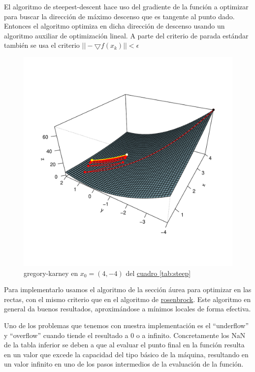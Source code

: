 El algoritmo de steepest-descent hace uso del gradiente de la función a optimizar para buscar la dirección de máximo descenso que es tangente al punto dado. Entonces el algoritmo optimiza en dicha dirección de descenso usando un algoritmo auxiliar de optimización lineal. A parte del criterio de parada estándar también se usa el criterio $|| - \bigtriangledown f(x_k) || < \epsilon $

\begin{figure}
\vspace{-4.8em}%
\hfill%
\hspace{-6ex}\includegraphics[width=0.9\linewidth]{../graphs/gregory_fun/steep/steep.pdf}%
\hfill\hbox{}
\vspace{-3.5em}
\caption{\small gregory-karney en $x_0=(4,-4)$ del \hyperref[tab:steep]{cuadro \ref*{tab:steep}}} \label{fig:steep1}
\vspace{-3em}
\end{figure}

Para implementarlo usamos el algoritmo de la sección áurea para optimizar en las rectas, con el mismo criterio que en el algoritmo de \hyperref[sub:alg-rose]{rosenbrock}. Este algoritmo en general da buenos resultados, aproximándose a mínimos locales de forma efectiva. 

Uno de los problemas que tenemos con nuestra implementación es el ``underflow'' y ``overflow'' cuando tiende el resultado a 0 o a infinito. Concretamente los NaN de la tabla inferior se deben a que al evaluar el punto final en la función resulta en un valor que excede la capacidad del tipo básico de la máquina, resultando en un valor infinito en uno de los pasos intermedios de la evaluación de la función.

